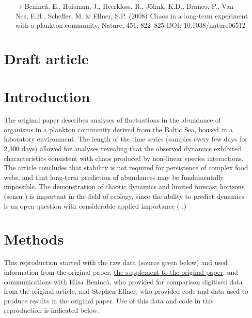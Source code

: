 \documentclass[10pt,a4paper,onecolumn]{article}
\begin{document}
\begin{rebox}
\small
\begin{flushleft}
\begin{itemize}
    \item[→] Benincà, E., Huisman, J., Heerkloss, R., Jöhnk, K.D., Branco, P., Van
Nes, E.H., Scheffer, M. \& Ellner, S.P. (2008) Chaos in a long-term
experiment with a plankton community. Nature, 451, 822--825 DOI:
10.1038/nature06512
  \end{itemize}\par
\end{flushleft}
\end{rebox}


\section{Draft article}\label{draft-article}

\section{Introduction}\label{introduction}

The original paper describes analyses of fluctuations in the abundance
of organisms in a plankton community derived from the Baltic Sea, housed
in a laboratory environment. The length of the time series (samples
every few days for 2,300 days) allowed for analyses revealing that the
observed dynamics exhibited characteristics consistent with chaos
produced by non-linear species interactions. The article concludes that
stability is not required for persistence of complex food webs, and that
long-term prediction of abundances may be fundamentally impossible. The
demonstration of chaotic dynamics and limited forecast horizons (sensu
\textcite{Petchey2015}) is important in the field of ecology, since the
ability to predict dynamics is an open question with considerable
applied importance (\textcite{Petchey2015} \textcite{Mouquet2015}.)

\section{Methods}\label{methods}

This reproduction started with the raw data (source given below) and
used information from the original paper,
\href{http://www.nature.com/nature/journal/v451/n7180/extref/nature06512-s1.pdf}{the
supplement to the original paper}, and communications with Elisa
Benincà, who provided for comparison digitised data from the original
article, and Stephen Ellner, who provided code and data used to produce
results in the original paper. Use of this data and code in this
reproduction is indicated below.
\end{document}

